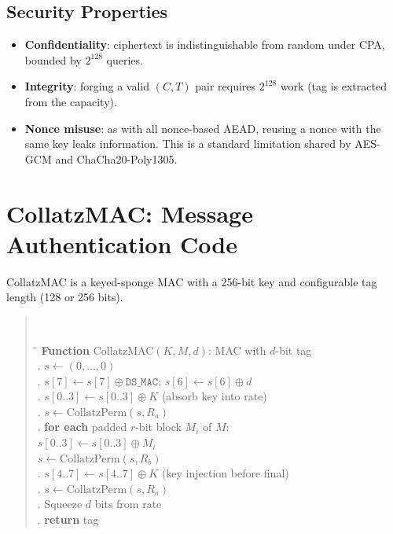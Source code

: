 \documentclass[11pt,a4paper]{article}
\begin{document}
\subsection{Security Properties}

\begin{itemize}
    \item \textbf{Confidentiality}: ciphertext is indistinguishable from
          random under CPA, bounded by $2^{128}$ queries.
    \item \textbf{Integrity}: forging a valid $(C, T)$ pair requires
          $2^{128}$ work (tag is extracted from the capacity).
    \item \textbf{Nonce misuse}: as with all nonce-based AEAD, reusing
          a nonce with the same key leaks information. This is a standard
          limitation shared by AES-GCM and ChaCha20-Poly1305.
\end{itemize}

\section{CollatzMAC: Message Authentication Code}
\label{sec:mac}

CollatzMAC is a keyed-sponge MAC \cite{sponge_security} with a 256-bit
key and configurable tag length (128 or 256 bits).

\begin{quote}\tt
\begin{tabbing}
\hspace{2em}\=\hspace{2em}\=\kill
\textrm{\textbf{Function}} CollatzMAC$(K, M, d)$:
\textrm{\small MAC with $d$-bit tag}\\[4pt]
. $s \leftarrow (0, \ldots, 0)$\\
. $s[7] \leftarrow s[7] \oplus \mathtt{DS\_MAC}$;\quad
$s[6] \leftarrow s[6] \oplus d$\\
. $s[0..3] \leftarrow s[0..3] \oplus K$ \textrm{\small (absorb key into rate)}\\
. $s \leftarrow \mathrm{CollatzPerm}(s, R_a)$\\
. \textbf{for each} padded $r$-bit block $M_i$ of $M$:\\
\> \> $s[0..3] \leftarrow s[0..3] \oplus M_i$\\
\> \> $s \leftarrow \mathrm{CollatzPerm}(s, R_b)$\\
. $s[4..7] \leftarrow s[4..7] \oplus K$ \textrm{\small (key injection before final)}\\
. $s \leftarrow \mathrm{CollatzPerm}(s, R_a)$\\
. Squeeze $d$ bits from rate\\
. \textbf{return} tag
\end{tabbing}
\end{quote}
\end{document}
